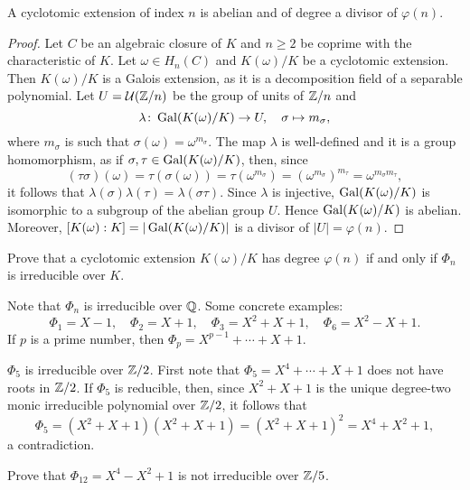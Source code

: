 \begin{proposition}
    A cyclotomic extension of index $n$ is abelian and of degree a divisor of $\varphi(n)$. 
\end{proposition}

\begin{proof}
    Let $C$ be an algebraic closure of $K$ and $n\geq2$ be coprime with the characteristic of $K$. 
    Let $\omega\in H_n(C)$ and $K(\omega)/K$ be a cyclotomic extension. Then $K(\omega)/K$
    is a Galois extension, as it is a decomposition field of a separable polynomial. 
    Let $U=\mathcal{U}(\mathbb{Z}/n)$ be the group of units of $\mathbb{Z}/n$ and 
    \[
    \lambda\colon \operatorname{Gal}(K(\omega)/K)\to U,
    \quad
    \sigma\mapsto m_{\sigma},
    \]
    where $m_{\sigma}$ is such that $\sigma(\omega)=\omega^{m_{\sigma}}$. The map $\lambda$ is well-defined and
    it is a group homomorphism, as if $\sigma,\tau\in\operatorname{Gal}(K(\omega)/K)$, then, since 
    \[
        (\tau\sigma)(\omega)=\tau(\sigma(\omega))=\tau(\omega^{m_\sigma})=\left(\omega^{m_\sigma}\right)^{m_\tau}=\omega^{m_\sigma m_\tau},
    \]
    it follows that $\lambda(\sigma)\lambda(\tau)=\lambda(\sigma\tau)$. Since 
    $\lambda$ is injective, $\operatorname{Gal}(K(\omega)/K)$ is isomorphic to a subgroup 
    of the abelian group $U$. Hence $\operatorname{Gal}(K(\omega)/K)$ is abelian. Moreover, 
    $[K(\omega):K]=|\operatorname{Gal}(K(\omega)/K)|$ is a divisor of $|U|=\varphi(n)$. 
\end{proof}

\begin{exercise}
    Prove that a cyclotomic extension $K(\omega)/K$ has degree $\varphi(n)$ if and only if 
    $\Phi_n$ is irreducible over $K$. 
\end{exercise}

Note that $\Phi_n$ is irreducible over $\mathbb{Q}$. Some concrete examples:
\[
\Phi_1=X-1,
\quad
\Phi_2=X+1,
\quad
\Phi_3=X^2+X+1,
\quad
\Phi_6=X^2-X+1.
\]
If $p$ is a prime number, then $\Phi_p=X^{p-1}+\cdots+X+1$. 

\begin{example}
    $\Phi_5$ is irreducible over $\mathbb{Z}/2$. First note that
    $\Phi_5=X^{4}+\cdots+X+1$ does not have roots in $\mathbb{Z}/2$. If 
    $\Phi_5$ is reducible, then, since
    $X^2+X+1$ is the unique degree-two 
    monic irreducible polynomial 
    over $\mathbb{Z}/2$, it follows that
    \[
    \Phi_5=(X^2+X+1)(X^2+X+1)=(X^2+X+1)^2=X^4+X^2+1,
    \]
    a contradiction.
\end{example}

\begin{exercise}
Prove that
$\Phi_{12}=X^4-X^2+1$ is not irreducible over $\mathbb{Z}/5$. 
\end{exercise}

